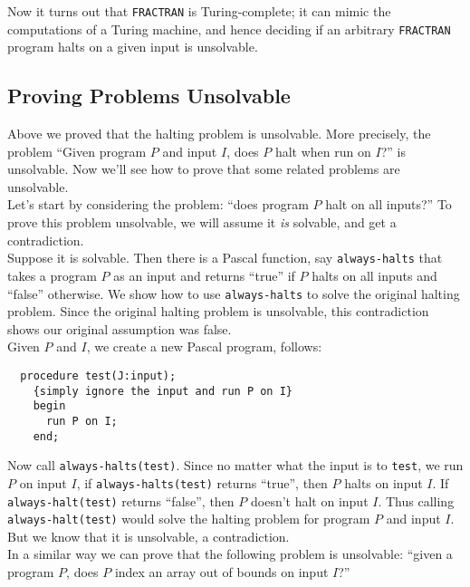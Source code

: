 \documentclass[12pt]{article}
\theoremstyle{plain}
\theoremstyle{definition}
\begin{document}
Now it turns out that \texttt{FRACTRAN} is Turing-complete;
it can mimic the computations of a Turing machine, and hence deciding if an arbitrary \texttt{FRACTRAN} program halts on a given input is unsolvable.

\subsection{Proving Problems Unsolvable}
Above we proved that the halting problem is unsolvable.
More precisely, the problem ``Given program $P$ and input $I$, does $P$ halt when run on $I$?'' is unsolvable.
Now we'll see how to prove that some related problems are unsolvable. \\

Let's start by considering the problem: ``does program $P$ halt on all inputs?''
To prove this problem unsolvable, we will assume it \emph{is} solvable, and get a contradiction. \\

Suppose it is solvable.
Then there is a Pascal function, say \texttt{always-halts} that takes a program $P$ as an input and returns ``true'' if $P$ halts on all inputs and ``false'' otherwise.
We show how to use \texttt{always-halts} to solve the original halting problem.
Since the original halting problem is unsolvable, this contradiction shows our original assumption was false. \\

Given $P$ and $I$, we create a new Pascal program, follows:
\begin{verbatim}
  procedure test(J:input);
    {simply ignore the input and run P on I}
    begin
      run P on I;
    end;
\end{verbatim}

Now call \texttt{always-halts(test)}.
Since no matter what the input is to \texttt{test}, we run $P$ on input $I$, if \texttt{always-halts(test)} returns ``true'', then $P$ halts on input $I$.
If \texttt{always-halt(test)} returns ``false'', then $P$ doesn't halt on input $I$.
Thus calling \texttt{always-halt(test)} would solve the halting problem for program $P$ and input $I$.
But we know that it is unsolvable, a contradiction. \\

In a similar way we can prove that the following problem is unsolvable: ``given a program $P$, does $P$ index an array out of bounds on input $I$?'' \\
\end{document}
